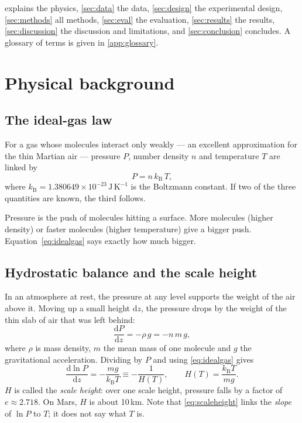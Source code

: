 \documentclass[11pt,a4paper]{article}
\newcommand{\dd}{\mathrm{d}}
\newcommand{\kB}{k_{\mathrm{B}}}
\begin{document}
 explains the physics, \cref{sec:data} the data, \cref{sec:design} the experimental design, \cref{sec:methods} all methods, \cref{sec:eval} the evaluation, \cref{sec:results} the results, \cref{sec:discussion} the discussion and limitations, and \cref{sec:conclusion} concludes. A glossary of terms is given in \cref{app:glossary}.

\section{Physical background}\label{sec:physics}

\subsection{The ideal-gas law}
For a gas whose molecules interact only weakly --- an excellent approximation for the thin Martian air --- pressure $P$, number density $n$ and temperature $T$ are linked by
\begin{equation}
P = n\,\kB\,T, \label{eq:idealgas}
\end{equation}
where $\kB = 1.380649\times10^{-23}\,\mathrm{J\,K^{-1}}$ is the Boltzmann constant. If two of the three quantities are known, the third follows.

\begin{plainbox}
Pressure is the push of molecules hitting a surface. More molecules (higher density) or faster molecules (higher temperature) give a bigger push. Equation~\eqref{eq:idealgas} says exactly how much bigger.
\end{plainbox}

\subsection{Hydrostatic balance and the scale height}
In an atmosphere at rest, the pressure at any level supports the weight of the air above it. Moving up a small height $\dd z$, the pressure drops by the weight of the thin slab of air that was left behind:
\begin{equation}
\frac{\dd P}{\dd z} = -\rho\, g = -n\, m\, g, \label{eq:hydro_z}
\end{equation}
where $\rho$ is mass density, $m$ the mean mass of one molecule and $g$ the gravitational acceleration. Dividing by $P$ and using \cref{eq:idealgas} gives
\begin{equation}
\frac{\dd \ln P}{\dd z} = -\frac{m g}{\kB T} \equiv -\frac{1}{H(T)},\qquad H(T) = \frac{\kB T}{m g}. \label{eq:scaleheight}
\end{equation}
$H$ is called the \emph{scale height}: over one scale height, pressure falls by a factor of $e\approx2.718$. On Mars, $H$ is about 10\,km. Note that \cref{eq:scaleheight} links the \emph{slope} of $\ln P$ to $T$; it does not say what $T$ is.
\end{document}
